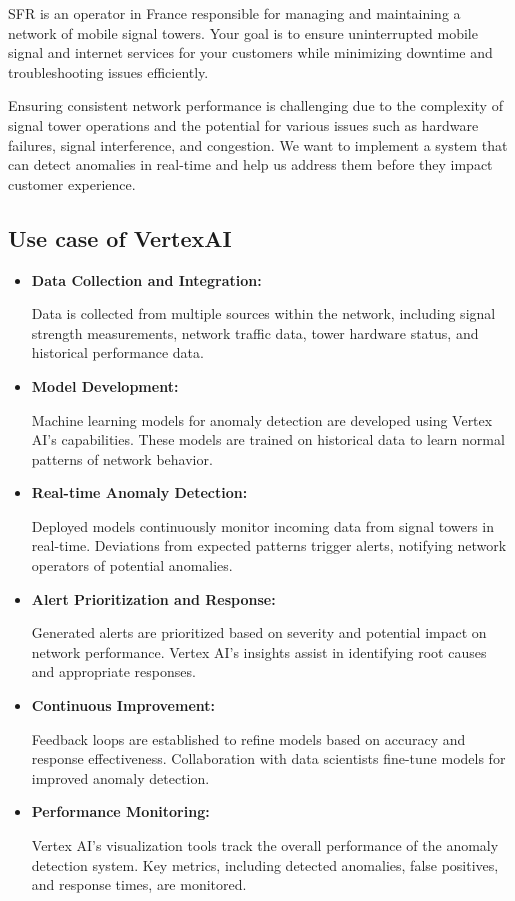 SFR is an operator in France responsible for managing and maintaining a network of mobile signal towers. Your goal is to ensure uninterrupted mobile signal and internet services for your customers while minimizing downtime and troubleshooting issues efficiently.

Ensuring consistent network performance is challenging due to the complexity of signal tower operations and the potential for various issues such as hardware failures, signal interference, and congestion. We want to implement a system that can detect anomalies in real-time and help us address them before they impact customer experience.

\subsection{Use case of VertexAI}

\begin{itemize}
    \item \textbf{Data Collection and Integration:}
    
    Data is collected from multiple sources within the network, including signal strength measurements, network traffic data, tower hardware status, and historical performance data.
    \item \textbf{Model Development:}

    Machine learning models for anomaly detection are developed using Vertex AI's capabilities. These models are trained on historical data to learn normal patterns of network behavior.

    \item \textbf{Real-time Anomaly Detection:}

    Deployed models continuously monitor incoming data from signal towers in real-time.
    Deviations from expected patterns trigger alerts, notifying network operators of potential anomalies.

    \item \textbf{Alert Prioritization and Response:}

    Generated alerts are prioritized based on severity and potential impact on network performance. Vertex AI's insights assist in identifying root causes and appropriate responses.

    \item \textbf{Continuous Improvement:}

    Feedback loops are established to refine models based on accuracy and response effectiveness. Collaboration with data scientists fine-tune models for improved anomaly detection.

    \item \textbf{Performance Monitoring:}

    Vertex AI's visualization tools track the overall performance of the anomaly detection system. Key metrics, including detected anomalies, false positives, and response times, are monitored.
\end{itemize}





